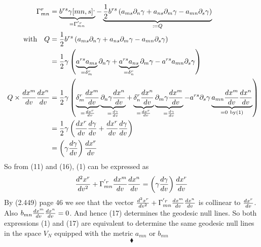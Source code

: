 \begin{align}
\Gamma^r_{mn} & =\underbrace{b^{rs}\gamma[mn,s]^,}_{=\Gamma^{'r}_{mn}}  - \underbrace{\frac{1}{2} b^{rs}\left( a_{ms}\partial_n \gamma+a_{ns}\partial_m \gamma-a_{mn}\partial_s \gamma \right)}_{\coloneqq Q}\\
\text{with}\quad Q &= \frac{1}{2} b^{rs}\left( a_{ms}\partial_n \gamma+a_{ns}\partial_m \gamma-a_{mn}\partial_s \gamma \right)\\
&= \frac{1}{2} \gamma \left( \underbrace{a^{rs}a_{ms}}_{ = \delta^r_m}\partial_n \gamma+\underbrace{a^{rs}a_{ns}}_{ = \delta^r_n}\partial_m \gamma-a^{rs}a_{mn}\partial_s \gamma \right)\\
\ Q \times \dv{x^m}{v}\dv{x^n}{v} &= \frac{1}{2} \gamma \left( \underbrace{\delta^r_m\dv{x^m}{v}}_{=\dv{x^r}{v}} \underbrace{\partial_n \gamma \dv{x^n}{v}}_{= \dv{\gamma}{v}}+\underbrace{\delta^r_n\dv{x^n}{v}}_{=\dv{x^r}{v}}\underbrace{\partial_m \gamma\dv{x^m}{v}}_{= \dv{\gamma}{v}}-a^{rs}\partial_s \gamma \underbrace{a_{mn}\dv{x^m}{v}\dv{x^n}{v}}_{ = 0 \ \text{by(1)}} \right)\\
&= \frac{1}{2} \gamma \left( \dv{x^r}{v}\dv{\gamma}{v} +\dv{x^r}{v}\dv{\gamma}{v} \right)\\
&= \left(\gamma\dv{\gamma}{v} \right)  \dv{x^r}{v}
\end{align}
So from (11) and (16), (1) can be expressed as 
\begin{align}
\dv[2]{x^r}{v} + \Gamma^{'r}_{mn}\dv{x^m}{v}\dv{x^n}{v} = \left(\gamma\dv{\gamma}{v} \right)  \dv{x^r}{v}
\end{align}
By (2.449) page 46 we see that the vector 
$\dv[2]{x^r}{v} + \Gamma^{'r}_{mn}\dv{x^m}{v}\dv{x^n}{v}$ is collinear to $\dv{x^r}{v}$. Also $b_{mn}\dv{x^m}{v}\dv{x^n}{v} = 0$. And hence (17) determines the geodesic null lines. So both expressions (1) and (17) are equivalent to determine the same geodesic null lines in the space $V_N$ equipped with the metric $a_{mn}$ or  $b_{mn}$
$$\blacklozenge$$
\newpage



